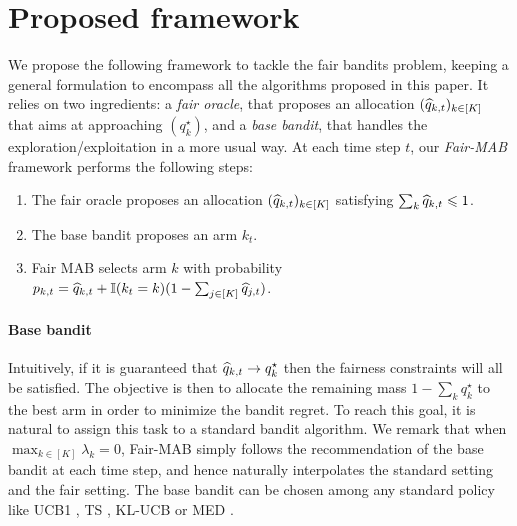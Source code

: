 \section{Proposed framework}

We propose the following framework to tackle the fair bandits problem, keeping a general formulation to encompass all the algorithms proposed in this paper. It relies on two ingredients: a \emph{fair oracle}, that proposes an allocation $(\widehat{q}_{k,t})_{k\in [K]}$ that aims at approaching $(q_k^\star)$, and a \emph{base bandit}, that handles the exploration/exploitation in a more usual way. At each time step $t$, our \emph{Fair-MAB} framework performs the following steps:

\begin{enumerate}
\item The fair oracle proposes an allocation $(\widehat{q}_{k,t})_{k\in [K]}$ satisfying $\sum_k \widehat{q}_{k, t}\leqslant1$.
\item The base bandit proposes an arm $k_t$.
\item Fair MAB selects arm $k$ with probability $p_{k, t}= \widehat{q}_{k,t} + \mathbb{I}(k_t=k)(1-\sum_{j \in [K]}\widehat{q}_{j, t})$.
\end{enumerate}

\paragraph{Base bandit} Intuitively, if it is guaranteed that $\widehat{q}_{k, t} \rightarrow q_k^\star$ then the fairness constraints will all be satisfied. The objective is then to allocate the remaining mass $1-\sum_k q_k^\star$ to the best arm in order to minimize the bandit regret. To reach this goal, it is natural to assign this task to a standard bandit algorithm. We remark that when $\max_{k \in [K]} \lambda_k= 0$, Fair-MAB simply follows the recommendation of the base bandit at each time step, and hence naturally interpolates the standard setting and the fair setting. The base bandit can be chosen among any standard policy like UCB1 \citep{auer2002finite}, TS \citep{TS_1933, TS12AG}, KL-UCB \citep{KL_UCB} or MED \citep{honda11MED, baudry2023general}. %

